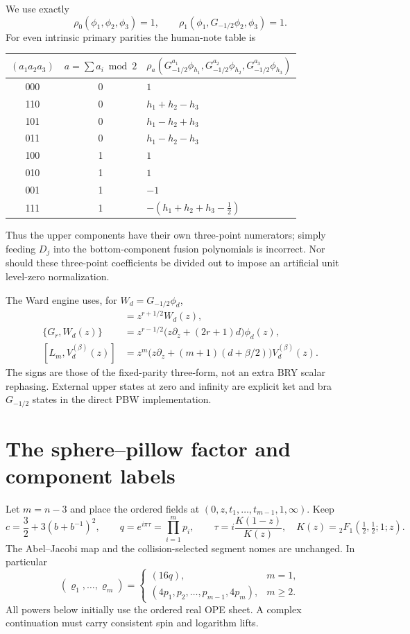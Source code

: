 \documentclass[11pt]{article}
\begin{document}
We use exactly
\begin{equation}
 \rho_0(\phi_1,\phi_2,\phi_3)=1,\qquad
 \rho_1(\phi_1,G_{-1/2}\phi_2,\phi_3)=1.
\end{equation}
For even intrinsic primary parities the human-note table is
\begin{center}
\begin{tabular}{ccl}
\toprule
$(a_1a_2a_3)$ & $a=\sum a_i\bmod2$ &
$\rho_a(G_{-1/2}^{a_1}\phi_{h_1},G_{-1/2}^{a_2}\phi_{h_2},G_{-1/2}^{a_3}\phi_{h_3})$\\
\midrule
000&0&$1$\\
110&0&$h_1+h_2-h_3$\\
101&0&$h_1-h_2+h_3$\\
011&0&$h_1-h_2-h_3$\\
100&1&$1$\\
010&1&$1$\\
001&1&$-1$\\
111&1&$-(h_1+h_2+h_3-\tfrac12)$\\
\bottomrule
\end{tabular}
\end{center}
Thus the upper components have their own three-point numerators; simply
feeding $D_j$ into the bottom-component fusion polynomials is incorrect.
Nor should these three-point coefficients be divided out to impose an
artificial unit level-zero normalization.

The Ward engine uses, for $W_d=G_{-1/2}\phi_d$,
\begin{align}
 [G_r,\phi_d(z)]&=z^{r+1/2}W_d(z),\\
 \{G_r,W_d(z)\}&=z^{r-1/2}
       \bigl(z\partial_z+(2r+1)d\bigr)\phi_d(z),\\
 [L_m,V^{(\beta)}_d(z)]&=z^m
       \bigl(z\partial_z+(m+1)(d+\beta/2)\bigr)V^{(\beta)}_d(z).
\end{align}
The signs are those of the fixed-parity three-form, not an extra BRY
scalar rephasing.  External upper states at zero and infinity are
explicit ket and bra $G_{-1/2}$ states in the direct PBW implementation.

\section{The sphere--pillow factor and component labels}

Let $m=n-3$ and place the ordered fields at
$(0,z,t_1,\ldots,t_{m-1},1,\infty)$.  Keep
\begin{equation}
 c=\frac32+3(b+b^{-1})^2,\qquad
 q=e^{i\pi\tau}=\prod_{i=1}^m p_i,\qquad
 \tau=i\frac{K(1-z)}{K(z)},\quad
 K(z)={}_2F_1(\tfrac12,\tfrac12;1;z).
\end{equation}
The Abel--Jacobi map and the collision-selected segment nomes are
unchanged.  In particular
\begin{equation}
 (\varrho_1,\ldots,\varrho_m)=
 \begin{cases}(16q),&m=1,\\
 (4p_1,p_2,\ldots,p_{m-1},4p_m),&m\ge2.
 \end{cases}
\end{equation}
All powers below initially use the ordered real OPE sheet.  A complex
continuation must carry consistent spin and logarithm lifts.
\end{document}
